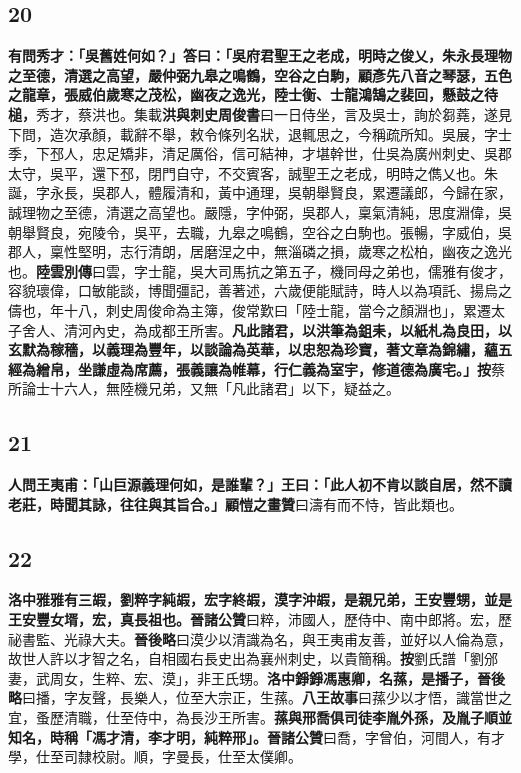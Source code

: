 \subsection*{20}

\textbf{有問秀才：「吳舊姓何如？」答曰：「吳府君聖王之老成，明時之俊乂，朱永長理物之至德，清選之高望，嚴仲弼九皋之鳴鶴，空谷之白駒，顧彥先八音之琴瑟，五色之龍章，張威伯歲寒之茂松，幽夜之逸光，陸士衡、士龍鴻鵠之裴回，懸鼓之待槌，}{\footnotesize 秀才，蔡洪也。集載\textbf{洪與刺史周俊書}曰一日侍坐，言及吳士，詢於芻蕘，遂見下問，造次承顏，載辭不舉，敕令條列名狀，退輒思之，今稱疏所知。吳展，字士季，下邳人，忠足矯非，清足厲俗，信可結神，才堪幹世，仕吳為廣州刺史、吳郡太守，吳平，還下邳，閉門自守，不交賓客，誠聖王之老成，明時之儁乂也。朱誕，字永長，吳郡人，體履清和，黃中通理，吳朝舉賢良，累遷議郎，今歸在家，誠理物之至德，清選之高望也。嚴隱，字仲弼，吳郡人，稟氣清純，思度淵偉，吳朝舉賢良，宛陵令，吳平，去職，九皋之鳴鶴，空谷之白駒也。張暢，字威伯，吳郡人，稟性堅明，志行清朗，居磨涅之中，無淄磷之損，歲寒之松柏，幽夜之逸光也。\textbf{陸雲別傳}曰雲，字士龍，吳大司馬抗之第五子，機同母之弟也，儒雅有俊才，容貌瓌偉，口敏能談，博聞彊記，善著述，六歲便能賦詩，時人以為項託、揚烏之儔也，年十八，刺史周俊命為主簿，俊常歎曰「陸士龍，當今之顏淵也」，累遷太子舍人、清河內史，為成都王所害。}\textbf{凡此諸君，以洪筆為鉏耒，以紙札為良田，以玄默為稼穡，以義理為豐年，以談論為英華，以忠恕為珍寶，著文章為錦繡，蘊五經為繒帛，坐謙虛為席薦，張義讓為帷幕，行仁義為室宇，修道德為廣宅。」}{\footnotesize \textbf{按}蔡所論士十六人，無陸機兄弟，又無「凡此諸君」以下，疑益之。}

\subsection*{21}

\textbf{人問王夷甫：「山巨源義理何如，是誰輩？」王曰：「此人初不肯以談自居，然不讀老莊，時聞其詠，往往與其旨合。」}{\footnotesize \textbf{顧愷之畫贊}曰濤有而不恃，皆此類也。}

\subsection*{22}

\textbf{洛中雅雅有三嘏，劉粹字純嘏，宏字終嘏，漠字沖嘏，是親兄弟，王安豐甥，並是王安豐女壻，宏，真長祖也。}{\footnotesize \textbf{晉諸公贊}曰粹，沛國人，歷侍中、南中郎將。宏，歷祕書監、光祿大夫。\textbf{晉後略}曰漠少以清識為名，與王夷甫友善，並好以人倫為意，故世人許以才智之名，自相國右長史出為襄州刺史，以貴簡稱。\textbf{按}劉氏譜「劉邠妻，武周女，生粹、宏、漠」，非王氏甥。}\textbf{洛中錚錚馮惠卿，名蓀，是播子，}{\footnotesize \textbf{晉後略}曰播，字友聲，長樂人，位至大宗正，生蓀。\textbf{八王故事}曰蓀少以才悟，識當世之宜，蚤歷清職，仕至侍中，為長沙王所害。}\textbf{蓀與邢喬俱司徒李胤外孫，及胤子順並知名，時稱「馮才清，李才明，純粹邢」。}{\footnotesize \textbf{晉諸公贊}曰喬，字曾伯，河間人，有才學，仕至司隸校尉。順，字曼長，仕至太僕卿。}

